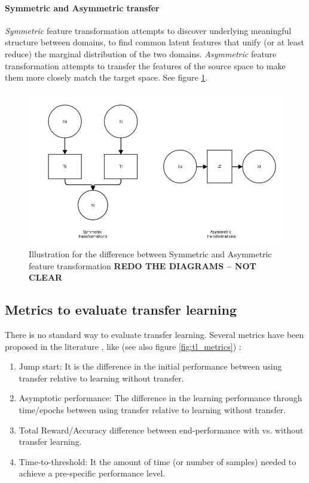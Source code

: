   \paragraph{Symmetric and Asymmetric transfer} \textit{Symmetric} feature transformation attempts to discover underlying meaningful structure between domains, to find common latent features that unify (or at least reduce) the marginal distribution of the two domains. \textit{Asymmetric} feature transformation attempts to transfer the features of the source space to make them more closely match the target space. See figure \ref{fig:feature_transformation}.

  \begin{figure}[!htbp]
  \centering
  \includegraphics[scale=0.4]{images/sota/feature_transformation.png}
  \caption[Symmetric and Asymmetric transfer]{Illustration for the difference between Symmetric and Asymmetric feature transformation \textbf{REDO THE DIAGRAMS -- NOT CLEAR}}
  \label{fig:feature_transformation}
  \end{figure}

  \subsection{Metrics to evaluate transfer learning}
  \par There is no standard way to evaluate transfer learning. Several metrics have been proposed in the literature \citep{taylor2007cross}, like (see also figure \ref{fig:tl_metrics}) :
  \begin{enumerate}
      \item Jump start: It is the difference in the initial performance between using transfer relative to learning without transfer.
      \item Asymptotic performance: The difference in the learning performance through time/epochs between using transfer relative to learning without transfer.
      \item Total Reward/Accuracy difference between end-performance with vs. without transfer learning.
      \item Time-to-threshold: It the amount of time (or number of samples) needed to achieve a pre-specific performance level.
  \end{enumerate}

